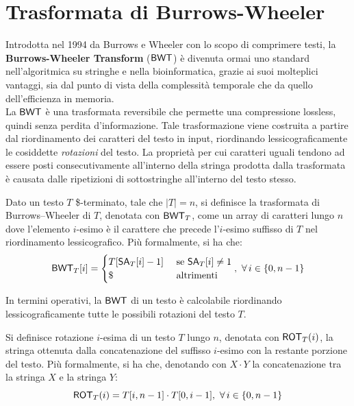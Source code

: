 \section{Trasformata di Burrows-Wheeler}
\label{secbwt}
Introdotta nel 1994 da Burrows e Wheeler con lo scopo di comprimere testi, la
\textbf{Burrows-Wheeler Transform} ($\mbox{\rm {\sf BWT}}$) \cite{bwt} è divenuta ormai uno
standard nell'algoritmica su stringhe e nella bioinformatica,
grazie ai suoi molteplici vantaggi, sia dal punto di vista della complessità
temporale che da quello dell'efficienza in memoria.\\
La $\mbox{\rm {\sf BWT}}$ è una trasformata reversibile che
permette una compressione lossless, quindi senza perdita
d'informazione. Tale trasformazione viene costruita a partire dal riordinamento
dei caratteri del testo in input, riordinando lessicograficamente le cosiddette
\textit{rotazioni} del testo. La proprietà per cui caratteri
uguali tendono ad essere posti consecutivamente all'interno della stringa
prodotta dalla trasformata è causata dalle ripetizioni di
sottostringhe all'interno del testo stesso.
\begin{definizione}
  Dato un testo $T$ \$-terminato, tale che $|T|=n$, si definisce la trasformata
  di
  Burrows--Wheeler di $T$, denotata con
  $\mbox{\rm {\sf BWT}}_T$, come un array di caratteri lungo $n$ dove l'elemento $i$-esimo è il
  carattere che precede l'$i$-esimo suffisso di $T$ nel riordinamento
  lessicografico. Più formalmente, si ha che:
  \begin{equation}
    \label{eq:bwt1}
    \mbox{\rm {\sf BWT}}_T[i]=
    \begin{cases}
      T[\mbox{\rm {\sf SA}}_T[i]-1]&\mbox{ se } \mbox{\rm {\sf SA}}_T[i]\neq 1\\
      \$&\mbox{ altrimenti}
    \end{cases},\,\, \forall\, i\in\{0,n-1\}
  \end{equation}
\end{definizione}
In termini operativi, la $\mbox{\rm {\sf BWT}}$ di un testo è calcolabile riordinando
lessicograficamente tutte le possibili rotazioni del testo $T$.
\begin{definizione}
  Si definisce rotazione $i$-esima di
  un testo $T$ lungo $n$, denotata con $\mbox{\rm {\sf ROT}}_T(i)$, la stringa ottenuta
  dalla concatenazione 
  del suffisso $i$-esimo con la restante porzione del testo. Più formalmente, si
  ha che, denotando con $X\cdot Y$ la concatenazione tra
  la stringa $X$ e la stringa $Y$:
  \begin{equation}
    \label{eq:bwt2}
    \mbox{\rm {\sf ROT}}_T(i)=T[i,n-1]\cdot T[0,i-1],\,\,\forall\, i\in\{0,n-1\}
  \end{equation}
\end{definizione}
